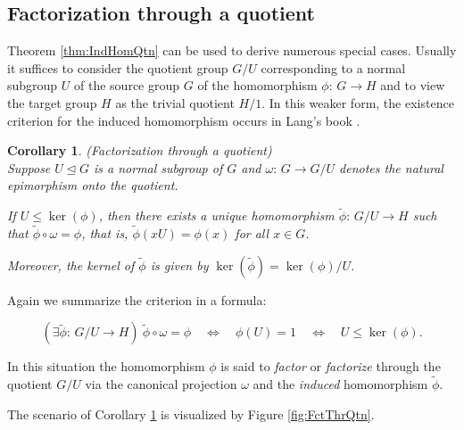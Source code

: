 \documentclass{amsart}
\newtheorem{corollary}{Corollary}[section]
\theoremstyle{definition}
\numberwithin{equation}{section}
\begin{document}
\subsection{Factorization through a quotient}
\label{ss:FactThruQtn}

\noindent
Theorem
\ref{thm:IndHomQtn}
can be used to derive numerous special cases.
Usually it suffices to consider the quotient group \(G/U\) corresponding to a normal subgroup \(U\) of the source group \(G\)
of the homomorphism \(\phi:\,G\to H\) and to view the target group \(H\) as the trivial quotient \(H/1\).
In this weaker form, the existence criterion for the induced homomorphism occurs in Lang's book
\cite[p.17]{La}.


\begin{corollary}
\label{cor:FctThrQtn}
(Factorization through a quotient)\\
Suppose \(U\unlhd G\) is a normal subgroup of \(G\) and
\(\omega:\,G\to G/U\) denotes the natural epimorphism onto the quotient.

If \(U\le\ker(\phi)\),
then there exists a unique homomorphism \(\tilde{\phi}:\,G/U\to H\) such that \(\tilde{\phi}\circ\omega=\phi\), that is,
\(\tilde{\phi}(xU)=\phi(x)\) for all \(x\in G\).

Moreover, the kernel of \(\tilde{\phi}\) is given by \(\ker(\tilde{\phi})=\ker(\phi)/U\).

\end{corollary}


\noindent
Again we summarize the criterion in a formula:

\begin{equation}
\label{eqn:FctThrQtn}
(\exists\tilde{\phi}:\,G/U\to H)\ \tilde{\phi}\circ\omega=\phi 
\quad\Longleftrightarrow\quad
\phi(U)=1
\quad\Longleftrightarrow\quad
U\le\ker(\phi).
\end{equation}

\noindent
In this situation the homomorphism \(\phi\) is said to \textit{factor} or \textit{factorize} through the quotient \(G/U\)
via the canonical projection \(\omega\) and the \textit{induced} homomorphism \(\tilde{\phi}\).

The scenario of Corollary
\ref{cor:FctThrQtn}
is visualized by Figure
\ref{fig:FctThrQtn}.
\end{document}
